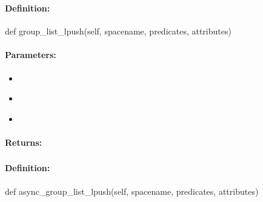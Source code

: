 \pagebreak
\subsubsection{}
\label{api:python:group_list_lpush}


\paragraph{Definition:}
\begin{pythoncode}
def group_list_lpush(self, spacename, predicates, attributes)
\end{pythoncode}

\paragraph{Parameters:}
\begin{itemize}[noitemsep]
\item {}\\

\item {}\\

\item {}\\

\end{itemize}

\paragraph{Returns:}


\pagebreak
\subsubsection{}
\label{api:python:async_group_list_lpush}


\paragraph{Definition:}
\begin{pythoncode}
def async_group_list_lpush(self, spacename, predicates, attributes)
\end{pythoncode}

